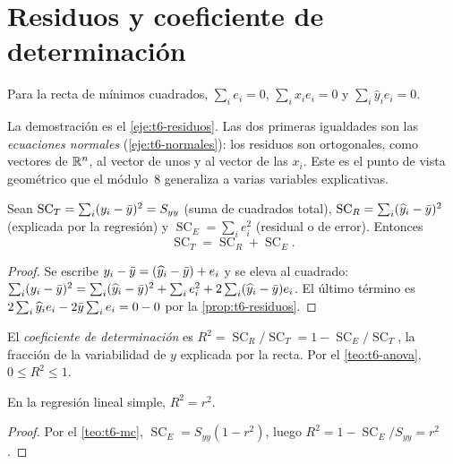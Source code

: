 \section{Residuos y coeficiente de determinación}

\begin{proposicion}\label{prop:t6-residuos}
Para la recta de mínimos cuadrados, $\sum_ie_i=0$, $\sum_ix_ie_i=0$ y $\sum_i\widehat y_ie_i=0$.
\end{proposicion}

La demostración es el \cref{eje:t6-residuos}. Las dos primeras igualdades son las \emph{ecuaciones normales} (\cref{eje:t6-normales}): los residuos son ortogonales, como vectores de $\mathbb{R}^{n}$, al vector de unos y al vector de las $x_i$. Este es el punto de vista geométrico que el módulo~8 generaliza a varias variables explicativas.

\begin{teorema}\label{teo:t6-anova}
Sean $\operatorname{SC}_T=\sum_i(y_i-\bar{y})^{2}=S_{yy}$ (suma de cuadrados total), $\operatorname{SC}_R=\sum_i(\widehat y_i-\bar{y})^{2}$ (explicada por la regresión) y $\operatorname{SC}_E=\sum_ie_i^{2}$ (residual o de error). Entonces
\[
\operatorname{SC}_T=\operatorname{SC}_R+\operatorname{SC}_E.
\]
\end{teorema}

\begin{proof}
Se escribe $y_i-\bar{y}=(\widehat y_i-\bar{y})+e_i$ y se eleva al cuadrado:
$\sum_i(y_i-\bar{y})^{2}=\sum_i(\widehat y_i-\bar{y})^{2}+\sum_ie_i^{2}+2\sum_i(\widehat y_i-\bar{y})e_i$.
El último término es $2\sum_i\widehat y_ie_i-2\bar{y}\sum_ie_i=0-0$ por la \cref{prop:t6-residuos}.
\end{proof}

\begin{definicion}\label{def:t6-r2}
El \emph{coeficiente de determinación} es $R^{2}=\operatorname{SC}_R/\operatorname{SC}_T=1-\operatorname{SC}_E/\operatorname{SC}_T$, la fracción de la variabilidad de $y$ explicada por la recta. Por el \cref{teo:t6-anova}, $0\le R^{2}\le1$.
\end{definicion}

\begin{corolario}\label{cor:t6-r2}
En la regresión lineal simple, $R^{2}=r^{2}$.
\end{corolario}

\begin{proof}
Por el \cref{teo:t6-mc}, $\operatorname{SC}_E=S_{yy}(1-r^{2})$, luego $R^{2}=1-\operatorname{SC}_E/S_{yy}=r^{2}$.
\end{proof}

